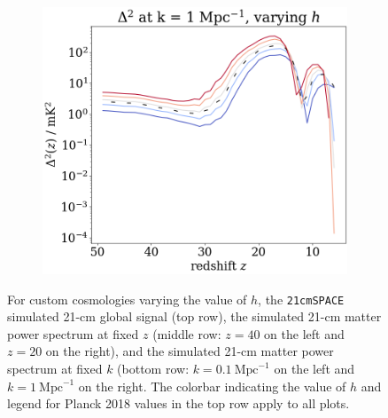 \documentclass[floats,floatfix,showpacs,amssymb,prd,superscriptaddress,nofootinbib]{revtex4-2} %
\newcommand{\code}{\texttt}
\begin{document}
\begin{figure}[H]
\begin{subfigure}[b]{0.45\textwidth}
     \end{subfigure}
     \hfill
     \begin{subfigure}[b]{0.45\textwidth}
         \centering
         \includegraphics[width=\textwidth]{images/simulation_results/power_spectrum_fixed_k_1_h.png}
         \label{fig:power_spectrum_fixed_k_1_h}
     \end{subfigure}
        \caption{For custom cosmologies varying the value of $h$, the \code{21cmSPACE} simulated 21-cm global signal (top row), the simulated 21-cm matter power spectrum at fixed $z$ (middle row: $z = 40$ on the left and $z = 20$ on the right), and the simulated 21-cm matter power spectrum at fixed $k$ (bottom row: $k = 0.1 ~\text{Mpc}^{-1}$ on the left and $k = 1 ~\text{Mpc}^{-1}$ on the right. The colorbar indicating the value of $h$ and legend for Planck 2018 values in the top row apply to all plots.}
        \label{fig:simulation_results_h}
\end{figure}
\end{document}
